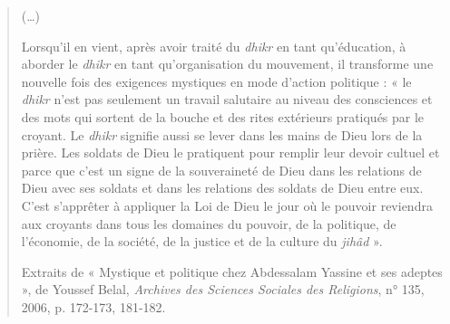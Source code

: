 \begin{quote}
(\ldots)

Lorsqu'il en vient, après avoir traité du \emph{dhikr} en tant
qu'éducation, à aborder le \emph{dhikr} en tant qu'organisation du
mouvement, il transforme une nouvelle fois des exigences mystiques en
mode d'action politique : « le \emph{dhikr} n'est pas seulement un
travail salutaire au niveau des consciences et des mots qui sortent de
la bouche et des rites extérieurs pratiqués par le croyant. Le
\emph{dhikr} signifie aussi se lever dans les mains de Dieu lors de la
prière. Les soldats de Dieu le pratiquent pour remplir leur devoir
cultuel et parce que c'est un signe de la souveraineté de Dieu dans les
relations de Dieu avec ses soldats et dans les relations des soldats de
Dieu entre eux. C'est s'apprêter à appliquer la Loi de Dieu le jour où
le pouvoir reviendra aux croyants dans tous les domaines du pouvoir, de
la politique, de l'économie, de la société, de la justice et de la
culture du \emph{jihâd} ».

Extraits de « Mystique et politique chez Abdessalam Yassine et ses
adeptes », de Youssef Belal, \emph{Archives des Sciences Sociales des
Religions}, n° 135, 2006, p. 172-173, 181-182.
\end{quote}
